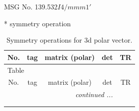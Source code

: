 \documentclass[fleqn,8pt]{jsarticle}
\begin{document}
\setcounter{MaxMatrixCols}{32}

\renewcommand{\tablename}{Table~}
\renewcommand{\figurename}{Figure~}
\begin{center}
\LARGE
MSG No. 139.532\quad$I4/mmm1'$
\end{center}
* symmetry operation
\renewcommand{\arraystretch}{1.3}
\begin{longtable}{ccccc}
\caption{Symmetry operations for 3d polar vector.}
 \\
 \hline \hline
No. & tag & matrix (polar) & det & TR \\ \hline \endfirsthead

\multicolumn{4}{l}{\tablename\ \thetable{}} \\
 \hline \hline
No. & tag & matrix (polar) & det & TR \\ \hline \endhead

 \hline \hline
\multicolumn{4}{r}{\footnotesize\it continued ...} \\ \endfoot

 \hline \hline
\multicolumn{4}{r}{} \\ \endlastfoot


\end{longtable}
\end{document}

